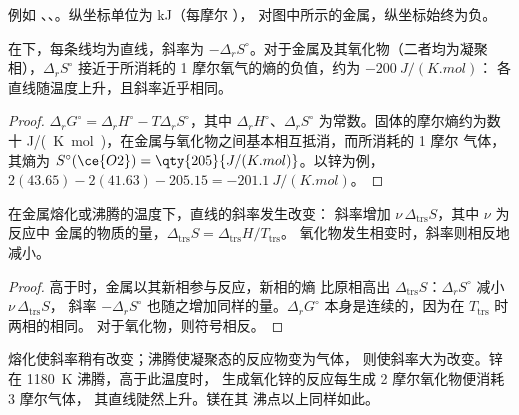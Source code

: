 例如 、、。纵坐标单位为 \unit{kJ}（每摩尔 ），
对图中所示的金属，纵坐标始终为负。

\begin{proposition}[直线]\label{prop:b2:ellingham:line}
在下，每条线均为直线，斜率为 $-\Delta_r
S^\circ$。对于金属及其氧化物（二者均为凝聚相），$\Delta_r S^\circ$
接近于所消耗的 1 摩尔氧气的熵的负值，约为
$-\qty{200}{J/(K.mol)}$：
各直线随温度上升，且斜率近乎相同。
\end{proposition}

\begin{proof}
$\Delta_r G^\circ = \Delta_r H^\circ - T\Delta_r S^\circ$，其中 $\Delta_r
H^\circ$、$\Delta_r S^\circ$ 为常数。固体的摩尔熵约为数十
\unit{J/(K.mol)}，在金属与氧化物之间基本相互抵消，而所消耗的 1 摩尔
气体，其熵为 $S^\circ(\ce{O2}) = \qty{205}{J/(K.mol)}$。以锌为例，
$2(43.65) - 2(41.63) - 205.15 = \qty{-201.1}{J/(K.mol)}$。
\end{proof}

\begin{proposition}[直线的转折]\label{prop:b2:ellingham:break}
在金属熔化或沸腾的温度下，直线的斜率发生改变：
斜率增加 $\nu\,\Delta_{\text{trs}}S$，其中 $\nu$ 为反应中
金属的物质的量，$\Delta_{\text{trs}}S = \Delta_{\text{trs}}H/T_{\text{trs}}$。
氧化物发生相变时，斜率则相反地减小。
\end{proposition}

\begin{proof}
高于时，金属以其新相参与反应，新相的熵
比原相高出 $\Delta_{\text{trs}}S$：$\Delta_r S^\circ$ 减小 $\nu\,\Delta_{\text{trs}}S$，
斜率 $-\Delta_r S^\circ$ 也随之增加同样的量。$\Delta_r G^\circ$
本身是连续的，因为在 $T_{\text{trs}}$ 时两相的相同。
对于氧化物，则符号相反。
\end{proof}

熔化使斜率稍有改变；沸腾使凝聚态的反应物变为气体，
则使斜率大为改变。锌在 \qty{1180}{K} 沸腾，高于此温度时，
生成氧化锌的反应每生成 2 摩尔氧化物便消耗 3 摩尔气体，
其直线陡然上升。镁在其
沸点以上同样如此。

